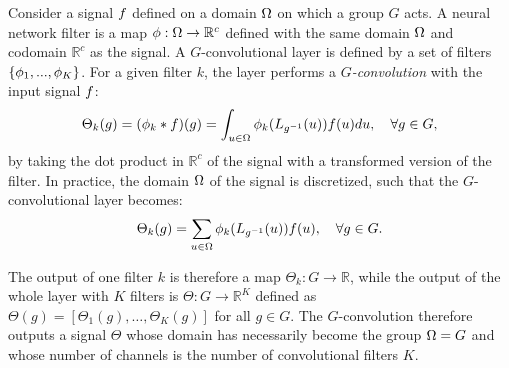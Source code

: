Consider a signal $f$ defined on a domain $\Omega$ on which a group $G$ acts. A neural network filter is a map $\phi: \Omega \rightarrow \mathbb{R}^c$ defined with the same domain $\Omega$ and codomain $\mathbb{R}^c$ as the signal. A $G$-convolutional layer is defined by a set of filters $\{\phi_1, ..., \phi_K\}$. For a given filter $k$, the layer performs a \textit{$G$-convolution }with the input signal $f$:
\begin{equation}
    \Theta_k(g) = (\phi_k * f)(g) = \int_{u \in \Omega} \phi_k(L_{g^{-1}}(u)) f(u) du,\quad \forall g \in G,
\end{equation}
by taking the dot product in $\mathbb{R}^c$ of the signal with a transformed version of the filter. In practice, the domain $\Omega$ of the signal is discretized, such that the $G$-convolutional layer becomes:
\begin{equation}
    \Theta_k(g) =  \sum_{u \in \Omega} \phi_k(L_{g^{-1}}(u)) f(u),\quad \forall g \in G.
\end{equation}

The output of one filter $k$ is therefore a map $\Theta_k: G \rightarrow \mathbb{R}$, while the output of the whole layer with $K$ filters is $\Theta: G \rightarrow \mathbb{R}^K$ defined as $\Theta(g) = [\Theta_1(g), \dots, \Theta_K(g)]$ for all $g \in G$. The $G$-convolution therefore outputs a signal $\Theta$ whose domain has necessarily become the group $\Omega = G$ and whose number of channels is the number of convolutional filters $K$.



